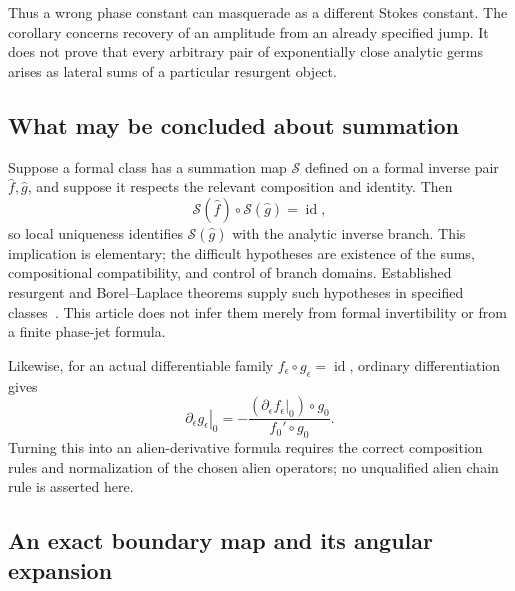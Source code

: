 \documentclass[11pt,a4paper]{article}
\theoremstyle{definition}
\theoremstyle{remark}
\newcommand{\id}{\operatorname{id}}
\numberwithin{equation}{section}
\begin{document}
Thus a wrong phase constant can masquerade as a different Stokes constant. The corollary concerns recovery of an amplitude from an already specified jump. It does not prove that every arbitrary pair of exponentially close analytic germs arises as lateral sums of a particular resurgent object.

\subsection{What may be concluded about summation}

Suppose a formal class has a summation map $\mathcal S$ defined on a formal inverse pair $\widehat f,\widehat g$, and suppose it respects the relevant composition and identity. Then
\[
 \mathcal S(\widehat f)\circ\mathcal S(\widehat g)=\id,
\]
so local uniqueness identifies $\mathcal S(\widehat g)$ with the analytic inverse branch. This implication is elementary; the difficult hypotheses are existence of the sums, compositional compatibility, and control of branch domains. Established resurgent and Borel--Laplace theorems supply such hypotheses in specified classes~\cite{SauzinNonlinear,SauzinIntro}. This article does not infer them merely from formal invertibility or from a finite phase-jet formula.

Likewise, for an actual differentiable family $f_\epsilon\circ g_\epsilon=\id$, ordinary differentiation gives
\[
 \left.\partial_\epsilon g_\epsilon\right|_{0}
 =-\frac{(\left.\partial_\epsilon f_\epsilon\right|_{0})\circ g_0}
 {f_0'\circ g_0}.
\]
Turning this into an alien-derivative formula requires the correct composition rules and normalization of the chosen alien operators; no unqualified alien chain rule is asserted here.

\subsection{An exact boundary map and its angular expansion}
\end{document}
